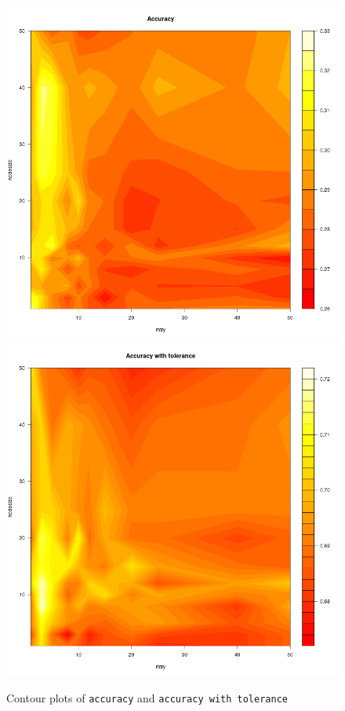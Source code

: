 \documentclass[8pt]{article}
\begin{document}
\begin{figure}[H]
    \includegraphics*[scale=0.25]{figures/contour_plot_accuracy.png}
    \includegraphics*[scale=0.25]{figures/contour_plot_accuracy_with_tolerance.png}
    \caption{Contour plots of \texttt{accuracy} and \texttt{accuracy with tolerance}}
    \label{fig:contour}
\end{figure}
\end{document}
